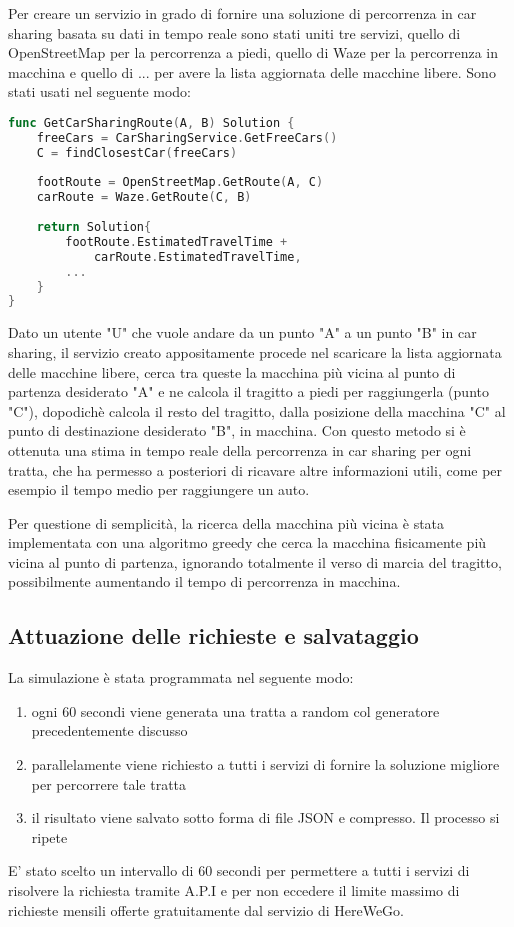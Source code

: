 Per creare un servizio in grado di fornire una soluzione di percorrenza in car sharing basata su dati in tempo reale sono stati uniti tre servizi, quello di OpenStreetMap per la percorrenza a piedi, quello di Waze per la percorrenza in macchina e quello di ... per avere la lista aggiornata delle macchine libere. Sono stati usati nel seguente modo:
\begin{lstlisting}[language=Go]
func GetCarSharingRoute(A, B) Solution {
	freeCars = CarSharingService.GetFreeCars()
	C = findClosestCar(freeCars)
	
	footRoute = OpenStreetMap.GetRoute(A, C)
	carRoute = Waze.GetRoute(C, B)
	
	return Solution{
		footRoute.EstimatedTravelTime +
			carRoute.EstimatedTravelTime,
		...
	}
}
\end{lstlisting}
Dato un utente "U" che vuole andare da un punto "A" a un punto "B" in car sharing, il servizio creato appositamente procede nel scaricare la lista aggiornata delle macchine libere, cerca tra queste la macchina più vicina al punto di partenza desiderato "A" e ne calcola il tragitto a piedi per raggiungerla (punto "C"), dopodichè calcola il resto del tragitto, dalla posizione della macchina "C" al punto di destinazione desiderato "B", in macchina. Con questo metodo si è ottenuta una stima in tempo reale della percorrenza in car sharing per ogni tratta, che ha permesso a posteriori di ricavare altre informazioni utili, come per esempio il tempo medio per raggiungere un auto.

Per questione di semplicità, la ricerca della macchina più vicina è stata implementata con una algoritmo greedy che cerca la macchina fisicamente più vicina al punto di partenza, ignorando totalmente il verso di marcia del tragitto, possibilmente aumentando il tempo di percorrenza in macchina.

\subsection{Attuazione delle richieste e salvataggio}

La simulazione è stata programmata nel seguente modo:
\begin{enumerate}
\item ogni 60 secondi viene generata una tratta a random col generatore precedentemente discusso
\item parallelamente viene richiesto a tutti i servizi di fornire la soluzione migliore per percorrere tale tratta
\item il risultato viene salvato sotto forma di file JSON e compresso. Il processo si ripete
\end{enumerate}
E' stato scelto un intervallo di 60 secondi per permettere a tutti i servizi di risolvere la richiesta tramite A.P.I e per non eccedere il limite massimo di richieste mensili offerte gratuitamente dal servizio di HereWeGo.



